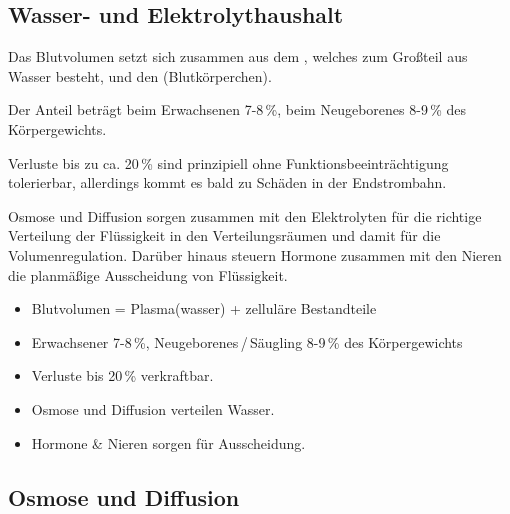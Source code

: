 \subsection{Wasser- und Elektrolythaushalt}
\label{topic:wasser-elektrolythaushalt}

{
Das Blutvolumen setzt sich zusammen aus dem , welches zum Großteil
aus Wasser besteht, und den  (Blutkörperchen).

Der Anteil beträgt beim Erwachsenen 7-8\,\%, beim
Neugeborenes 8-9\,\% des Körpergewichts. 

Verluste bis zu ca. 20\,\% sind prinzipiell ohne
Funktionsbeeinträchtigung tolerierbar, allerdings
kommt es bald zu Schäden in der Endstrombahn. 

Osmose und Diffusion sorgen zusammen mit den Elektrolyten für die richtige
Verteilung der Flüssigkeit in den Verteilungsräumen und damit für die
Volumenregulation. Darüber hinaus steuern Hormone zusammen mit den Nieren die
planmäßige Ausscheidung von Flüssigkeit.
}{
\begin{itemize}
  \item Blutvolumen = Plasma(wasser) + zelluläre Bestandteile
  \item Erwachsener 7-8\,\%, Neugeborenes\,/\,Säugling 8-9\,\% des Körpergewichts
  \item Verluste bis 20\,\% verkraftbar.
  \item Osmose und Diffusion verteilen Wasser.
  \item Hormone \& Nieren sorgen für Ausscheidung.
\end{itemize}
}
{}{}{}









\subsection{Osmose und Diffusion}
\label{topic:osmose}
\label{topic:diffusion}

